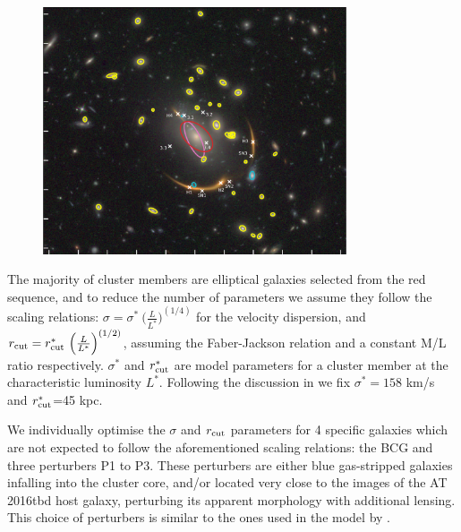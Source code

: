 \documentclass[12pt]{article}
\def\SNABC{AT 2016tbd\xspace}
\begin{document}
\begin{figure}
    \centering
    \includegraphics[width=0.8\textwidth]{Paper/Figures/fig4_lensmodel_layout.pdf}
    \caption{ }
    \label{fig:model_components}
\end{figure}


The majority of cluster members are elliptical galaxies selected from the red sequence, and to reduce the number of parameters we assume they follow the scaling relations: $\sigma=\sigma^*\ {\Big(\frac{L}{L^*}\Big)}^{(1/4)}$ for the velocity dispersion, 
and $r_{\rm cut}=r_{\rm cut}^*\ {\Big(\frac{L}{L^*}\Big)}^{(1/2)}$, assuming the Faber-Jackson relation and a constant M/L ratio respectively. $\sigma^*$ and $r^*_{\rm cut}$ are model parameters for a cluster member at the characteristic luminosity $L^*$.  Following the discussion in \cite{richard_locuss_2010} we fix $\sigma^*=158$ km/s and $r_{\rm cut}^*$=45 kpc. 

We individually optimise the $\sigma$ and $r_{\rm cut}$ parameters for 4 specific galaxies which are not expected to follow the aforementioned scaling relations: the BCG and three perturbers P1 to P3. These perturbers are either blue gas-stripped galaxies infalling into the cluster core, and/or located very close to the images of the \SNABC host galaxy, perturbing its apparent morphology with additional lensing. This choice of perturbers is similar to the ones used in the model by \cite{newman_resolving_2018}. 
\end{document}
